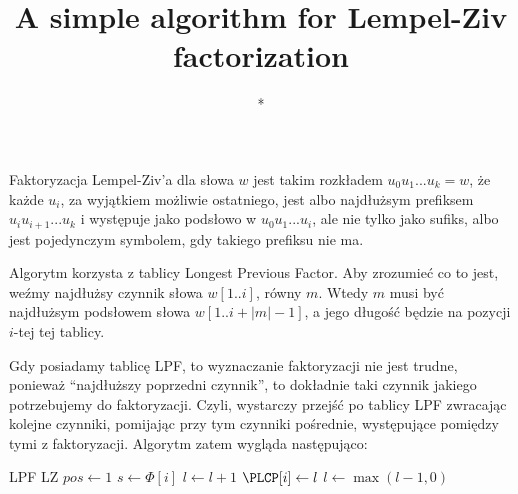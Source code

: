 \documentclass[a4paper,12pt]{article}
\title{A simple algorithm for Lempel-Ziv factorization}
\author{*}
\begin{document}
\maketitle

Faktoryzacja Lempel-Ziv'a dla słowa $w$ jest takim rozkładem $u_0 u_1 ... u_k = w$,
że każde $u_i$, za wyjątkiem możliwie ostatniego,
jest albo najdłużsym prefiksem $u_i u_{i + 1} ... u_k$ i występuje jako podsłowo w $u_0 u_1 ... u_i$,
ale nie tylko jako sufiks,
albo jest pojedynczym symbolem, gdy takiego prefiksu nie ma.

Algorytm korzysta z tablicy Longest Previous Factor.
Aby zrozumieć co to jest, weźmy najdłużsy czynnik słowa $w[1..i]$, równy $m$.
Wtedy $m$ musi być najdłużsym podsłowem słowa $w[1..i + |m| - 1]$,
a jego długość będzie na pozycji $i$-tej tej tablicy.

Gdy posiadamy tablicę LPF, to wyznaczanie faktoryzacji nie jest trudne,
ponieważ ``najdłuższy poprzedni czynnik'', to dokładnie taki czynnik jakiego potrzebujemy do faktoryzacji.
Czyli, wystarczy przejść po tablicy LPF zwracając kolejne czynniki,
pomijając przy tym czynniki pośrednie, występujące pomiędzy tymi z faktoryzacji.
Algorytm zatem wygląda następująco:

\begin{algorithmic} 
\REQUIRE LPF
\ENSURE LZ
\STATE $pos \gets 1$
\STATE $s \gets \Phi[i]$
\STATE $l \gets l + 1$
\ENDWHILE
\STATE $\PLCP[i] \gets l$
\STATE $l \gets \max(l - 1, 0)$
\end{algorithmic}
\end{document}
